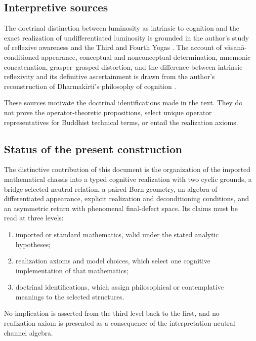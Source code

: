 \documentclass[11pt,reqno]{scrartcl}
\theoremstyle{plain}
\theoremstyle{definition}
\theoremstyle{remark}
\begin{document}
\subsection{Interpretive sources}

The doctrinal distinction between luminosity as intrinsic to cognition and
the exact realization of undifferentiated luminosity is grounded in the
author's study of reflexive awareness and the Third and Fourth Yogas
\cite{Yiannopoulos2012}.  The account of v\=asan\=a-conditioned appearance,
conceptual and nonconceptual determination, mnemonic concatenation,
grasper--grasped distortion, and the difference between intrinsic reflexivity
and its definitive ascertainment is drawn from the author's reconstruction of
Dharmak\=irti's philosophy of cognition \cite{Yiannopoulos2020}.

These sources motivate the doctrinal identifications made in the text.  They
do not prove the operator-theoretic propositions, select unique operator
representatives for Buddhist technical terms, or entail the realization
axioms.

\subsection{Status of the present construction}

The distinctive contribution of this document is the organization of the
imported mathematical chassis into a typed cognitive realization with two
cyclic grounds, a bridge-selected neutral relation, a paired Born geometry,
an algebra of differentiated appearance, explicit realization and
deconditioning conditions, and an asymmetric return with phenomenal
final-defect space.  Its claims must be read at three levels:
\begin{enumerate}[label=(\roman*)]
  \item imported or standard mathematics, valid under the stated analytic
  hypotheses;
  \item realization axioms and model choices, which select one cognitive
  implementation of that mathematics;
  \item doctrinal identifications, which assign philosophical or contemplative
  meanings to the selected structures.
\end{enumerate}
No implication is asserted from the third level back to the first, and no
realization axiom is presented as a consequence of the interpretation-neutral
channel algebra.
\end{document}
